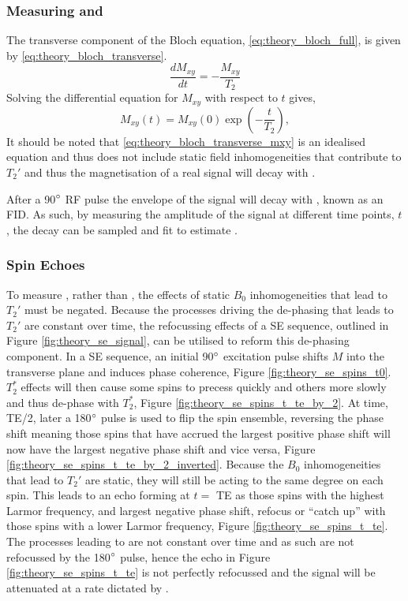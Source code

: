 \subsubsection{Measuring \ttwo and \ttwostar}
The transverse component of the Bloch equation, \eqref{eq:theory_bloch_full}, is given by \eqref{eq:theory_bloch_transverse}.
\begin{equation}
\frac{dM_{xy}}{dt} = - \frac{M_{xy}}{T_2}
\label{eq:theory_bloch_transverse}
\end{equation}
Solving the differential equation for $M_{xy}$ with respect to $t$ gives,
\begin{equation}
M_{xy}\left(t\right) = M_{xy}\left(0\right)\exp\left(-\frac{t}{T_2}\right),
\label{eq:theory_bloch_transverse_mxy}
\end{equation}
It should be noted that \eqref{eq:theory_bloch_transverse_mxy} is an idealised equation and thus does not include static field inhomogeneities that contribute to $T_2'$ and thus the magnetisation of a real signal will decay with \ttwostar.

After a 90$\degree$ \ac{RF} pulse the envelope of the signal will decay with \ttwostar, known as an \ac{FID}. As such, by measuring the amplitude of the signal at different time points, $t$, the decay can be sampled and fit to estimate \ttwostar.

\subsubsection{Spin Echoes}
To measure \ttwo, rather than \ttwostar, the effects of static $B_0$ inhomogeneities that lead to $T_2'$ must be negated. Because the processes driving the de-phasing that leads to $T_2'$ are constant over time, the refocussing effects of a \ac{SE} sequence, outlined in Figure \ref{fig:theory_se_signal}, can be utilised to reform this de-phasing component. In a \ac{SE} sequence, an initial 90$\degree$ excitation pulse shifts $M$ into the transverse plane and induces phase coherence, Figure \ref{fig:theory_se_spins_t0}. $T_2^*$ effects will then cause some spins to precess quickly and others more slowly and thus de-phase with $T_2^*$, Figure \ref{fig:theory_se_spins_t_te_by_2}. At time, \ac{TE}/2, later a 180$\degree$ pulse is used to flip the spin ensemble, reversing the phase shift meaning those spins that have accrued the largest positive phase shift will now have the largest negative phase shift and vice versa, Figure \ref{fig:theory_se_spins_t_te_by_2_inverted}. Because the $B_0$ inhomogeneities that lead to $T_2'$ are static, they will still be acting to the same degree on each spin. This leads to an echo forming at $t =$ \ac{TE} as those spins with the highest Larmor frequency, and largest negative phase shift, refocus or ``catch up'' with those spins with a lower Larmor frequency, Figure \ref{fig:theory_se_spins_t_te}. The processes leading to \ttwo are not constant over time and as such are not refocussed by the 180$\degree$ pulse, hence the echo in Figure \ref{fig:theory_se_spins_t_te} is not perfectly refocussed and the signal will be attenuated at a rate dictated by \ttwo.


